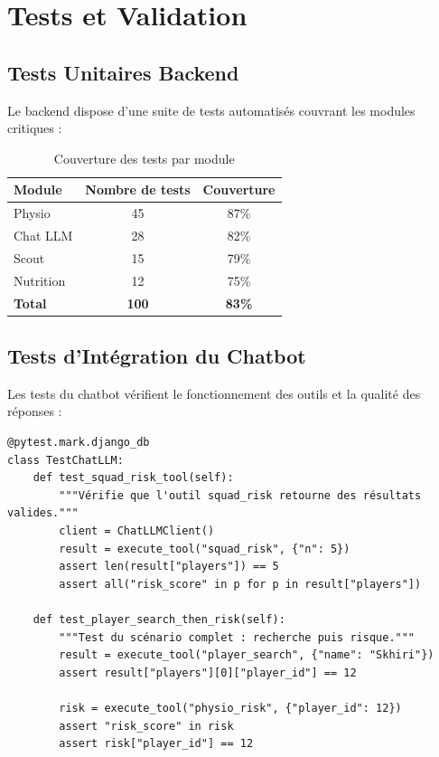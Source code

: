 \section{Tests et Validation}

\subsection{Tests Unitaires Backend}

Le backend dispose d'une suite de tests automatisés couvrant les modules critiques :

\begin{table}[H]
\centering
\begin{tabular}{|l|c|c|}
\hline
\textbf{Module} & \textbf{Nombre de tests} & \textbf{Couverture} \\
\hline
Physio & 45 & 87\% \\
Chat LLM & 28 & 82\% \\
Scout & 15 & 79\% \\
Nutrition & 12 & 75\% \\
\hline
\textbf{Total} & \textbf{100} & \textbf{83\%} \\
\hline
\end{tabular}
\caption{Couverture des tests par module}
\label{tab:test-coverage}
\end{table}

\subsection{Tests d'Intégration du Chatbot}

Les tests du chatbot vérifient le fonctionnement des outils et la qualité des réponses :

\begin{lstlisting}[style=codeframe]
@pytest.mark.django_db
class TestChatLLM:
    def test_squad_risk_tool(self):
        """Vérifie que l'outil squad_risk retourne des résultats valides."""
        client = ChatLLMClient()
        result = execute_tool("squad_risk", {"n": 5})
        assert len(result["players"]) == 5
        assert all("risk_score" in p for p in result["players"])

    def test_player_search_then_risk(self):
        """Test du scénario complet : recherche puis risque."""
        result = execute_tool("player_search", {"name": "Skhiri"})
        assert result["players"][0]["player_id"] == 12

        risk = execute_tool("physio_risk", {"player_id": 12})
        assert "risk_score" in risk
        assert risk["player_id"] == 12
\end{lstlisting}

